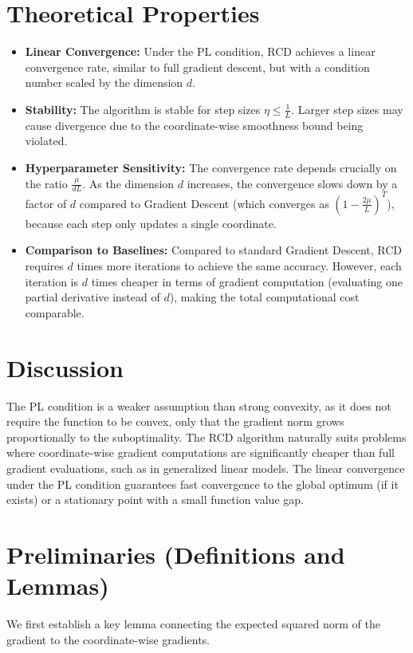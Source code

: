 \documentclass{article}
\begin{document}
\section*{Theoretical Properties}
\begin{itemize}
    \item \textbf{Linear Convergence:} Under the PL condition, RCD achieves a linear convergence rate, similar to full gradient descent, but with a condition number scaled by the dimension $d$.
    \item \textbf{Stability:} The algorithm is stable for step sizes $\eta \leq \frac{1}{L}$. Larger step sizes may cause divergence due to the coordinate-wise smoothness bound being violated.
    \item \textbf{Hyperparameter Sensitivity:} The convergence rate depends crucially on the ratio $\frac{\mu}{dL}$. As the dimension $d$ increases, the convergence slows down by a factor of $d$ compared to Gradient Descent (which converges as $(1 - \frac{2\mu}{L})^T$), because each step only updates a single coordinate.
    \item \textbf{Comparison to Baselines:} Compared to standard Gradient Descent, RCD requires $d$ times more iterations to achieve the same accuracy. However, each iteration is $d$ times cheaper in terms of gradient computation (evaluating one partial derivative instead of $d$), making the total computational cost comparable.
\end{itemize}

\section*{Discussion}
The PL condition is a weaker assumption than strong convexity, as it does not require the function to be convex, only that the gradient norm grows proportionally to the suboptimality. The RCD algorithm naturally suits problems where coordinate-wise gradient computations are significantly cheaper than full gradient evaluations, such as in generalized linear models. The linear convergence under the PL condition guarantees fast convergence to the global optimum (if it exists) or a stationary point with a small function value gap.

\section*{Preliminaries (Definitions and Lemmas)}
We first establish a key lemma connecting the expected squared norm of the gradient to the coordinate-wise gradients.
\end{document}
